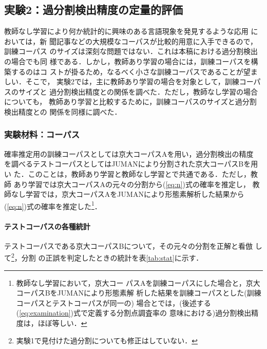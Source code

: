 \subsection{実験2：過分割検出精度の定量的評価}
\label{sec:size}

教師なし学習により何か統計的に興味のある言語現象を発見するような応用
\cite[など]{shiNnou95,ikehara95,shimohata95,hisamitsu97}においては，新
聞記事などの大規模なコーパスが比較的用意に入手できるので，訓練コーパス
のサイズは深刻な問題ではない．これは本稿における過分割検出の場合でも同
様である．しかし，教師あり学習の場合には，訓練コーパスを構築するのはコ
ストが掛るため，なるべく小さな訓練コーパスであることが望ましい．そこで，
実験2では，主に教師あり学習の場合を対象として，訓練コーパスのサイズと
過分割検出精度との関係を調べた．ただし，教師なし学習の場合についても，
教師あり学習と比較するために，訓練コーパスのサイズと過分割検出精度との
関係を同様に調べた．

\subsubsection*{実験材料：コーパス}

確率推定用の訓練コーパスとしては京大コーパスAを用い，過分割検出の精度
を調べるテストコーパスとしてはJUMANにより分割された京大コーパスBを用い
た．このことは，教師あり学習と教師なし学習とで共通である．ただし，教師
あり学習では京大コーパスAの元々の分割から(\ref{eq:n})式の確率を推定し，
教師なし学習では，京大コーパスAをJUMANにより形態素解析した結果から
(\ref{eq:n})式の確率を推定した\footnote{教師なし学習において，京大コー
  パスAを訓練コーパスにした場合と，京大コーパスBをJUMANにより形態素解
  析した結果を訓練コーパスとした(訓練コーパスとテストコーパスが同一の)
  場合とでは，(後述する(\ref{eq:examination})式で定義する分割点調査率の
  意味における)過分割検出精度は，ほぼ等しい．}．

\paragraph{テストコーパスの各種統計}

テストコーパスである京大コーパスBについて，その元々の分割を正解と看倣
して\footnote{実験1で見付けた過分割についても修正はしていない．}，分割
の正誤を判定したときの統計を表\ref{tab:stat}に示す．

